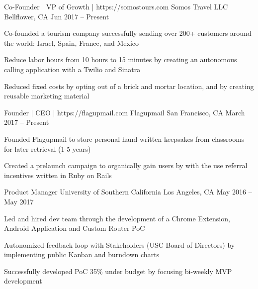 \documentclass[]{awesome-cv}
\begin{document}
\begin{cventries}
	\cventry
	{Co-Founder | VP of Growth | https://somostours.com}
	{Somos Travel LLC}
	{Bellflower, CA}
	{Jun 2017 – Present}
	{\begin{cvitems}
		\item {Co-founded a tourism company successfully sending over 200+ customers around the world: Israel, Spain, France, and Mexico}
		\item {Reduce labor hours from 10 hours to 15 minutes by creating an autonomous calling application with a Twilio and Sinatra}
		\item {Reduced fixed costs by opting out of a brick and mortar location, and by creating reusable marketing material}
		\end{cvitems}}
	\cventry
	{Founder | CEO | https://flagupmail.com}
	{Flagupmail}
	{San Francisco, CA}
	{March 2017 – Present}
	{\begin{cvitems}
		\item {Founded Flagupmail to store personal hand-written keepsakes from classrooms for later retrieval (1-5 years)}
		\item {Created a prelaunch campaign to organically gain users by with the use referral incentives written in Ruby on Rails}
	\end{cvitems}}
	\cventry
	{Product Manager}
	{University of Southern California}
	{Los Angeles, CA}
	{May 2016 – May 2017}
	{\begin{cvitems}
		\item {Led and hired dev team through the development of a Chrome Extension, Android Application and Custom Router PoC}
		\item {Autonomized feedback loop with Stakeholders (USC Board of Directors) by implementing public Kanban and burndown charts}
		\item {Successfully developed PoC 35\% under budget by focusing bi-weekly MVP development}
		\end{cvitems}}
\end{cventries}
\end{document}
